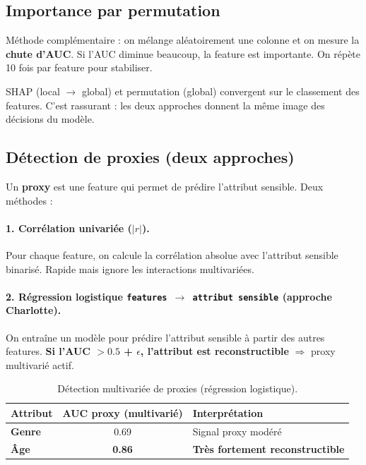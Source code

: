 \documentclass[11pt, a4paper]{article}
\begin{document}
\subsection{Importance par permutation}

M\'{e}thode compl\'{e}mentaire : on m\'{e}lange al\'{e}atoirement une colonne et on mesure la \textbf{chute d'AUC}. Si l'AUC diminue beaucoup, la feature est importante. On r\'{e}p\`{e}te 10 fois par feature pour stabiliser.

\begin{leconbox}
SHAP (local $\to$ global) et permutation (global) convergent sur le classement des features. C'est rassurant : les deux approches donnent la m\^{e}me image des d\'{e}cisions du mod\`{e}le.
\end{leconbox}

\subsection{D\'{e}tection de proxies (deux approches)}

Un \textbf{proxy} est une feature qui permet de pr\'{e}dire l'attribut sensible. Deux m\'{e}thodes :

\paragraph{1. Corr\'{e}lation univari\'{e}e ($|r|$).}
Pour chaque feature, on calcule la corr\'{e}lation absolue avec l'attribut sensible binaris\'{e}. Rapide mais ignore les interactions multivari\'{e}es.

\paragraph{2. R\'{e}gression logistique \texttt{features $\to$ attribut sensible} (approche Charlotte).}
On entra\^{i}ne un mod\`{e}le pour pr\'{e}dire l'attribut sensible \`{a} partir des autres features. \textbf{Si l'AUC $> 0.5$ + $\epsilon$, l'attribut est reconstructible} $\Rightarrow$ proxy multivari\'{e} actif.

\begin{table}[H]
\centering
\begin{tabular}{lcl}
\toprule
\textbf{Attribut} & \textbf{AUC proxy (multivari\'{e})} & \textbf{Interpr\'{e}tation} \\
\midrule
\textbf{Genre} & 0.69 & Signal proxy mod\'{e}r\'{e} \\
\textbf{\^{A}ge}  & \textbf{0.86} & \textbf{Tr\`{e}s fortement reconstructible} \\
\bottomrule
\end{tabular}
\caption{D\'{e}tection multivari\'{e}e de proxies (r\'{e}gression logistique).}
\end{table}
\end{document}
